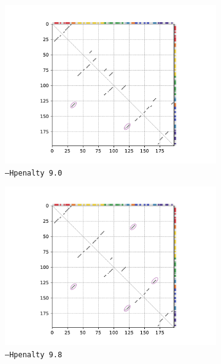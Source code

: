 \documentclass[../../master.tex]{subfiles}
\begin{document}
\begin{figure}[!ht]
	\centering
	\begin{subfigure}[t]{0.5\textwidth}
		\centering
		\includegraphics[trim=55 10 70 10, clip, width=\textwidth]{pic/results/designs/dotplots/azo_pkisspred_90.pdf}
		\caption{\texttt{--Hpenalty 9.0}
		}\label{fig:pkiss_hpenalty:a}
	\end{subfigure}%
	\begin{subfigure}[t]{0.5\textwidth}
		\centering
		\includegraphics[trim=55 10 70 10, clip, width=\textwidth]{pic/results/designs/dotplots/azo_pkisspred_98.pdf}
		\caption{\texttt{--Hpenalty 9.8}
		}\label{fig:pkiss_hpenalty:b}
	\end{subfigure}
	\caption[Influence of the H-Type Pseudoknot Penalty on \texttt{pKiss}]{
}
\end{figure}
\end{document}
